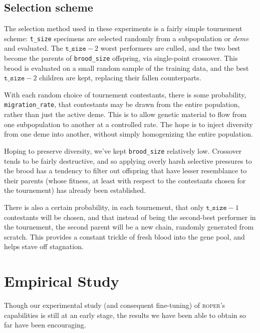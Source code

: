 \subsection{Selection scheme}

The selection method used in these experiments is a fairly simple
tournement scheme: \texttt{t\_size} specimens are selected randomly from a
subpopulation or \emph{deme} and evaluated. The
$\texttt{t\_size}-2$ worst
performers are culled, and the two best become the parents of
\texttt{brood\_size} offspring, via single-point crossover. This
brood is evaluated on a small random sample of the training data,
and the best $\texttt{t\_size} - 2$ children are kept, replacing
their fallen counterparts. 

With each random choice of tournement contestants, there is some
probability, \texttt{migration\_rate}, that contestants may be
drawn from the entire population, rather than just the active
deme. This is to allow genetic material to flow from one
subpopulation to another at a controlled rate. The hope is to
inject diversity from one deme into another, without simply
homogenizing the entire population. 

Hoping to preserve diversity, we've kept \texttt{brood\_size}
relatively low. Crossover tends to be fairly destructive, and so
applying overly harsh selective pressures to the brood has a
tendency to filter out offspring that have lesser resemblance to
their parents (whose fitness, at least with respect to the
contestants chosen for the tournement) has already been
established. 

There is also a certain probability, in each tournement, that
only $\texttt{t\_size} - 1$ contestants will be chosen, and that
instead of being the second-best performer in the tournement, the
second parent will be a new chain, randomly generated from
scratch. This provides a constant trickle of fresh blood into the
gene pool, and helps stave off stagnation.



\section{Empirical Study}

Though our experimental study (and consequent fine-tuning) of
\textsc{roper}'s capabilities is still at an early stage, the
results we have been able to obtain so far have been encouraging. 


